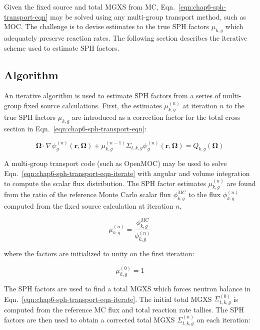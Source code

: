 \noindent Given the fixed source and total MGXS from MC, Eqn.~\ref{eqn:chap6-sph-transport-eqn} may be solved using any multi-group transport method, such as MOC. The challenge is to devise estimates to the true SPH factors $\mu_{k,g}$ which adequately preserve reaction rates. The following section describes the iterative scheme used to estimate SPH factors.


\subsection{Algorithm}
\label{sec:sph-algorithm}

An iterative algorithm is used to estimate SPH factors from a series of multi-group fixed source calculations. First, the estimates $\mu_{k,g}^{(n)}$ at iteration $n$ to the true SPH factors $\mu_{k,g}$ are introduced as a correction factor for the total cross section in Eqn.~\ref{eqn:chap6-sph-transport-eqn}:

\begin{dmath}
\label{eqn:chap6-sph-transport-eqn-iterate}
\mathbf{\Omega} \cdot \nabla \psi_{g}^{(n)}(\mathbf{r},\mathbf{\Omega}) + \mu_{k,g}^{(n-1)}\Sigma_{t,k,g}\psi_{g}^{(n)}(\mathbf{r},\mathbf{\Omega}) = Q_{k,g}(\mathbf{\Omega})
\end{dmath}

\noindent A multi-group transport code (such as OpenMOC) may be used to solve Eqn.~\ref{eqn:chap6-sph-transport-eqn-iterate} with angular and volume integration to compute the scalar flux distribution. The SPH factor estimates $\mu_{k,g}^{(n)}$ are found from the ratio of the reference Monte Carlo scalar flux $\phi_{k,g}^{MC}$ to the flux $\phi_{k,g}^{(n)}$ computed from the fixed source calculation at iteration $n$,

\begin{equation}
\label{eqn:chap6-sph-update}
\mu_{k,g}^{(n)} = \frac{\phi_{k,g}^{MC}}{\phi_{k,g}^{(n)}}
\end{equation}

\noindent where the factors are initialized to unity on the first iteration:

\begin{dmath}
\label{eqn:chap6-sph-initial}
\mu_{k,g}^{(0)} = 1
\end{dmath}

The SPH factors are used to find a total MGXS which forces neutron balance in Eqn.~\ref{eqn:chap6-sph-transport-eqn-iterate}. The initial total MGXS $\Sigma_{t,k,g}^{(0)}$ is computed from the reference MC flux and total reaction rate tallies. The SPH factors are then used to obtain a corrected total MGXS $\Sigma_{t,k,g}^{(n)}$ on each iteration:

